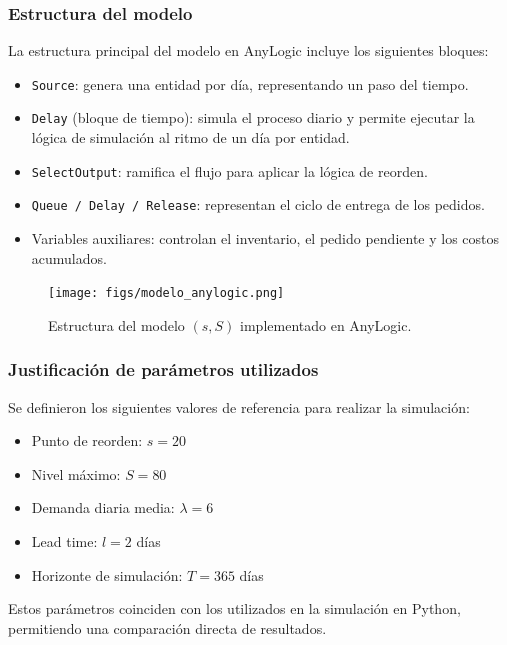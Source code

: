 \documentclass[12pt]{article}
\begin{document}
\subsubsection*{Estructura del modelo}

La estructura principal del modelo en AnyLogic incluye los siguientes bloques:

\begin{itemize}
    \item \texttt{Source}: genera una entidad por día, representando un paso del tiempo.
    \item \texttt{Delay} (bloque de tiempo): simula el proceso diario y permite ejecutar la lógica de simulación al ritmo de un día por entidad.
    \item \texttt{SelectOutput}: ramifica el flujo para aplicar la lógica de reorden.
    \item \texttt{Queue / Delay / Release}: representan el ciclo de entrega de los pedidos.
    \item Variables auxiliares: controlan el inventario, el pedido pendiente y los costos acumulados.
\end{itemize}

\vspace{0.5em}
\begin{figure}[H]
    \centering
    \texttt{[image: figs/modelo\_anylogic.png]}
    \caption{Estructura del modelo $(s, S)$ implementado en AnyLogic.}
\end{figure}

\subsubsection*{Justificación de parámetros utilizados}

Se definieron los siguientes valores de referencia para realizar la simulación:

\begin{itemize}
    \item Punto de reorden: \( s = 20 \)
    \item Nivel máximo: \( S = 80 \)
    \item Demanda diaria media: \( \lambda = 6 \)
    \item Lead time: \( l = 2 \) días
    \item Horizonte de simulación: \( T = 365 \) días
\end{itemize}

Estos parámetros coinciden con los utilizados en la simulación en Python, permitiendo una comparación directa de resultados.
\end{document}
